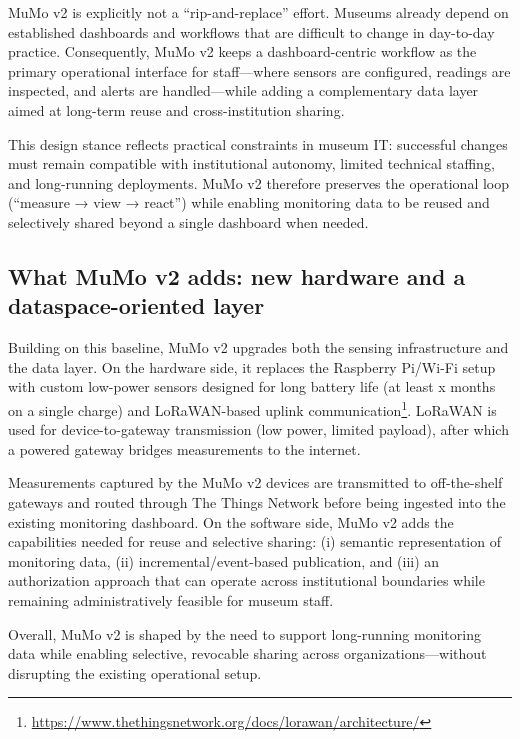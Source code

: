 \documentclass{ceurart}
\begin{document}
MuMo v2 is explicitly not a ``rip-and-replace'' effort. Museums already
depend on established dashboards and workflows that are difficult to
change in day-to-day practice. Consequently, MuMo v2 keeps a
dashboard-centric workflow as the primary operational interface for
staff---where sensors are configured, readings are inspected, and alerts
are handled---while adding a complementary data layer aimed at long-term
reuse and cross-institution sharing.

This design stance reflects practical constraints in museum IT:
successful changes must remain compatible with institutional autonomy,
limited technical staffing, and long-running deployments. MuMo v2
therefore preserves the operational loop (``measure → view → react'')
while enabling monitoring data to be reused and selectively shared
beyond a single dashboard when needed.

\subsection{What MuMo v2 adds: new hardware and a dataspace-oriented
layer}\label{what-mumo-v2-adds-new-hardware-and-a-dataspace-oriented-layer}

Building on this baseline, MuMo v2 upgrades both the sensing
infrastructure and the data layer. On the hardware side, it replaces the
Raspberry Pi/Wi-Fi setup with custom low-power sensors designed for long
battery life (at least x months on a single charge) and LoRaWAN-based
uplink
communication\footnote{\url{https://www.thethingsnetwork.org/docs/lorawan/architecture/}}.
LoRaWAN is used for device-to-gateway transmission (low power, limited
payload), after which a powered gateway bridges measurements to the
internet.

Measurements captured by the MuMo v2 devices are transmitted to
off-the-shelf gateways and routed through The Things Network before
being ingested into the existing monitoring dashboard. On the software
side, MuMo v2 adds the capabilities needed for reuse and selective
sharing: (i) semantic representation of monitoring data, (ii)
incremental/event-based publication, and (iii) an authorization approach
that can operate across institutional boundaries while remaining
administratively feasible for museum staff.

Overall, MuMo v2 is shaped by the need to support long-running
monitoring data while enabling selective, revocable sharing across
organizations---without disrupting the existing operational setup.
\end{document}
